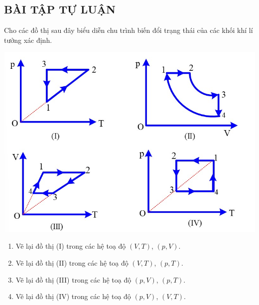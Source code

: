\subsection{BÀI TẬP TỰ LUẬN}
\setcounter{ex}{0}
\begin{ex}
	Cho các đồ thị sau đây biểu diễn chu trình biến đổi trạng thái của các khối khí lí tưởng xác định.
	\begin{center}
		\includegraphics[width=0.65\linewidth]{figs/VN12-Y24-PH-SYL-014P-10}
	\end{center}
	\begin{enumerate}[label=\alph*)]
		\item Vẽ lại đồ thị (I) trong các hệ toạ độ $\left(V, T\right)$, $\left(p, V\right)$.
		\item Vẽ lại đồ thị (II) trong các hệ toạ độ  $\left(V,T\right)$, $\left(p, T\right)$.
		\item Vẽ lại đồ thị (III) trong các hệ toạ độ $\left(p, V\right)$, $\left(p, T\right)$.
		\item Vẽ lại đồ thị (IV) trong các hệ toạ độ $\left(p, V\right)$, $\left(V, T\right)$.
	\end{enumerate}
\end{ex}
